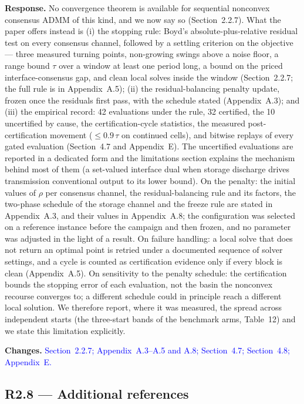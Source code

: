 \documentclass[11pt]{article}
\newcommand{\rresponse}[1]{\noindent\textbf{Response.} #1\par\smallskip}
\newcommand{\rchanges}[1]{\noindent\textbf{Changes.} \textcolor{blue}{#1}\par\medskip}
\begin{document}
\rresponse{No convergence theorem is available for sequential nonconvex consensus ADMM of this kind, and we
now say so (Section~2.2.7). What the paper offers instead is (i) the stopping rule: Boyd's absolute-plus-relative
residual test on every consensus channel, followed by a settling criterion on the objective --- three
measured turning points, non-growing swings above a noise floor, a range bound $\tau$ over a window at
least one period long, a bound on the priced interface-consensus gap, and clean local solves inside the
window (Section~2.2.7; the full rule is in Appendix~A.5); (ii) the residual-balancing penalty update, frozen once the residuals first pass,
with the schedule stated (Appendix~A.3); and (iii) the empirical record: 42 evaluations under the rule, 32
certified, the 10 uncertified by cause, the certification-cycle statistics, the measured
post-certification movement ($\le 0.9\,\tau$ on continued cells), and bitwise replays of every gated
evaluation (Section~4.7 and Appendix~E). The uncertified evaluations are reported in a dedicated form and
the limitations section explains the mechanism behind most of them (a set-valued interface dual when
storage discharge drives transmission conventional output to its lower bound). On the penalty: the
initial values of $\rho$ per consensus channel, the residual-balancing rule and its factors, the two-phase
schedule of the storage channel and the freeze rule are stated in Appendix~A.3, and their values in Appendix~A.8; the configuration was
selected on a reference instance before the campaign and then frozen, and no parameter was adjusted in
the light of a result. On failure handling: a local solve that does not return an optimal point is retried
under a documented sequence of solver settings, and a cycle is counted as certification evidence only if
every block is clean (Appendix~A.5). On sensitivity to the penalty schedule: the certification bounds the
stopping error of each evaluation, not the basin the nonconvex recourse converges to; a different
schedule could in principle reach a different local solution. We therefore report, where it was measured,
the spread across independent starts (the three-start bands of the benchmark arms, Table~12) and we
state this limitation explicitly.}
\rchanges{Section~2.2.7; Appendix~A.3--A.5 and A.8; Section~4.7; Section~4.8; Appendix~E.}

\subsection*{R2.8 --- Additional references}
\end{document}
